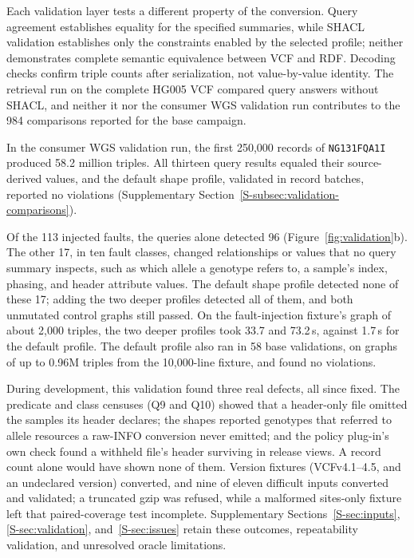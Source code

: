 \documentclass[pdflatex,sn-mathphys-num]{sn-jnl}
\begin{document}
Each validation layer tests a different property of the conversion.
Query agreement establishes equality for the specified summaries, while SHACL validation establishes only the constraints enabled by the selected profile; neither demonstrates complete semantic equivalence between VCF and RDF.
Decoding checks confirm triple counts after serialization, not value-by-value identity.
The retrieval run on the complete HG005 VCF compared query answers without SHACL, and neither it nor the consumer WGS validation run contributes to the 984 comparisons reported for the base campaign.

In the consumer WGS validation run, the first 250,000 records of \texttt{NG131FQA1I} produced 58.2 million triples.
All thirteen query results equaled their source-derived values, and the default shape profile, validated in record batches, reported no violations (Supplementary Section~\ref{S-subsec:validation-comparisons}).

Of the 113 injected faults, the queries alone detected 96 (Figure~\ref{fig:validation}b).
The other 17, in ten fault classes, changed relationships or values that no query summary inspects, such as which allele a genotype refers to, a sample's index, phasing, and header attribute values.
The default shape profile detected none of these 17; adding the two deeper profiles detected all of them, and both unmutated control graphs still passed.
On the fault-injection fixture's graph of about 2,000 triples, the two deeper profiles took 33.7 and 73.2\,s, against 1.7\,s for the default profile.
The default profile also ran in 58 base validations, on graphs of up to 0.96M triples from the 10,000-line fixture, and found no violations.

During development, this validation found three real defects, all since fixed.
The predicate and class censuses (Q9 and Q10) showed that a header-only file omitted the samples its header declares; the shapes reported genotypes that referred to allele resources a raw-INFO conversion never emitted; and the policy plug-in's own check found a withheld file's header surviving in release views.
A record count alone would have shown none of them.
Version fixtures (VCFv4.1--4.5, and an undeclared version) converted, and nine of eleven difficult inputs converted and validated; a truncated gzip was refused, while a malformed sites-only fixture left that paired-coverage test incomplete.
Supplementary Sections~\ref{S-sec:inputs}, \ref{S-sec:validation}, and~\ref{S-sec:issues} retain these outcomes, repeatability validation, and unresolved oracle limitations.
\end{document}
